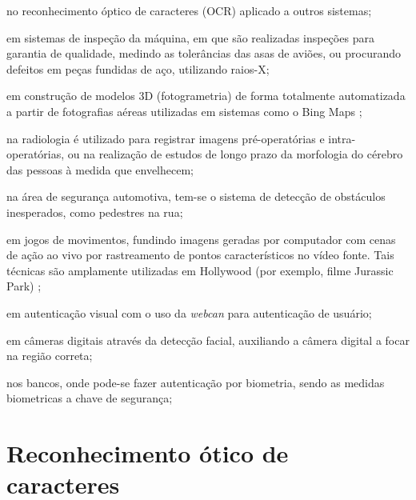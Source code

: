 \begin{alineas}
\item no reconhecimento óptico de caracteres (OCR) aplicado a outros sistemas;
\item em sistemas de inspeção da máquina, em que são realizadas inspeções para garantia de qualidade, medindo as tolerâncias das asas de aviões, ou procurando defeitos em peças fundidas de aço, utilizando raios-X;
\item em construção de modelos 3D (fotogrametria) de forma totalmente automatizada a partir de fotografias aéreas utilizadas em sistemas como o Bing Maps \cite{bingmaps};
\item na radiologia é utilizado para registrar imagens pré-operatórias e intra-operatórias, ou na realização de estudos de longo prazo da morfologia do cérebro das pessoas à medida que envelhecem;
\item na área de segurança automotiva, tem-se o sistema de detecção de obstáculos inesperados, como pedestres na rua;
\item em jogos de movimentos, fundindo imagens geradas por computador com cenas de ação ao vivo por rastreamento de pontos característicos no vídeo fonte. Tais técnicas são amplamente utilizadas em Hollywood (por exemplo, filme Jurassic Park) \cite{robinandzafar};
\item em autenticação visual com o uso da \textit{webcan} para autenticação de usuário;
\item em câmeras digitais através da detecção facial, auxiliando a câmera digital a focar na região correta;
\item nos bancos, onde pode-se fazer autenticação por biometria, sendo as medidas biometricas a chave de segurança; 
\end{alineas}

\section{Reconhecimento ótico de caracteres}


